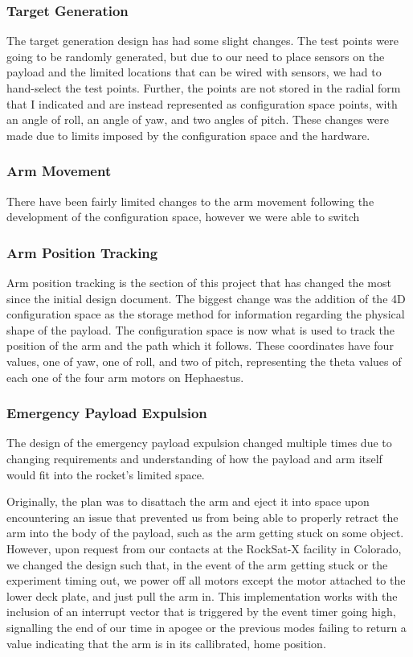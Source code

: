 \subsubsection{Target Generation}
The target generation design has had some slight changes. The test points were going to be 
randomly generated, but due to our need to place sensors on the payload and the limited locations
that can be wired with sensors, we had to hand-select the test points. Further, the points are 
not stored in the radial form that I indicated and are instead represented as configuration space
 points, with an angle of roll, an angle of yaw, and two angles of pitch. These changes were made
due to limits imposed by the configuration space and the hardware.

\subsubsection{Arm Movement}
There have been fairly limited changes to the arm movement following the development of the 
configuration space, however we were able to switch

\subsubsection{Arm Position Tracking}
Arm position tracking is the section of this project that has changed the most since the initial 
design document. The biggest change was the addition of the 4D configuration space as the storage 
method for information regarding the physical shape of the payload. The configuration space is now 
what is used to track the position of the arm and the path which it follows. These coordinates have 
four values, one of yaw, one of roll, and two of pitch, representing the theta values of each one of 
the four arm motors on Hephaestus.

\subsubsection{Emergency Payload Expulsion}
The design of the emergency payload expulsion changed multiple times due to
changing requirements and understanding of how the \gls{payload} and arm itself would fit into the rocket's limited space.

Originally, the plan was to disattach the arm and eject it into space upon
encountering an issue that prevented us from being able to properly retract the arm into the body of the payload,
such as the arm getting stuck on some object. However, upon request from our contacts at the RockSat-X facility in 
Colorado, we changed the design such that, in the event of the arm getting stuck or the experiment timing out, 
we power off all motors except the motor attached to the lower deck plate, and just pull the arm in. This
implementation works with the inclusion of an interrupt vector that is triggered by the event timer
going high, signalling the end of our time in apogee or the previous modes failing to return a value indicating
that the arm is in its callibrated, home position.

